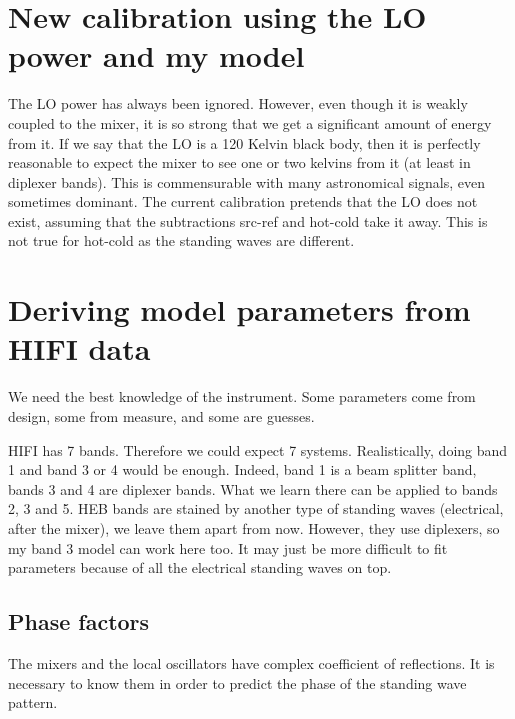 \section{New calibration using the LO power and my model}
The LO power has always been ignored.
However, even though it is weakly coupled to the mixer, it is so strong that we get a significant amount of energy from it.
If we say that the LO is a 120 Kelvin black body, then it is perfectly reasonable to expect the mixer to see one or two kelvins from it (at least in diplexer bands).
This is commensurable with many astronomical signals, even sometimes dominant.
The current calibration pretends that the LO does not exist, assuming that the subtractions src-ref and hot-cold take it away.
This is not true for hot-cold as the standing waves are different.



\section{Deriving model parameters from HIFI data}
We need the best knowledge of the instrument.
Some parameters come from design, some from measure, and some are guesses.

HIFI has 7 bands.  Therefore we could expect 7 systems.
Realistically, doing band 1 and band 3 or 4 would be enough.
Indeed, band 1 is a beam splitter band, bands 3 and 4 are diplexer bands.
What we learn there can be applied to bands 2, 3 and 5.
HEB bands are stained by another type of standing waves (electrical, after the mixer), we leave them apart from now.
However, they use diplexers, so my band 3 model can work here too.  It may just be more difficult to fit parameters because of all the electrical standing waves on top.

\subsection{Phase factors}
The mixers and the local oscillators have complex coefficient of reflections.
It is necessary to know them in order to predict the phase of the standing wave pattern.

